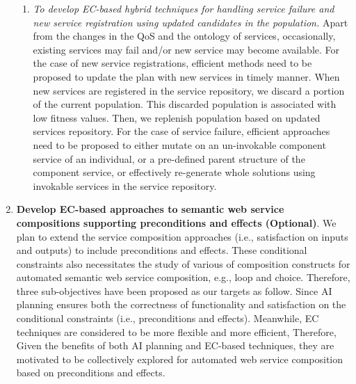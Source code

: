 \begin{enumerate}
\begin{enumerate}
 
 \item \emph{To develop EC-based hybrid techniques for handling service failure and new service registration using updated candidates in the population.} Apart from the changes in the QoS and the ontology of services, occasionally, existing services may fail and/or new service may become available. For the case of new service registrations, efficient methods need to be proposed to update the plan with new services in timely manner. When new services are registered in the service repository, we discard a portion of the current population. This discarded population is associated with low fitness values. Then, we replenish population based on updated services repository. For the case of service failure, efficient approaches need to be proposed to either mutate on an un-invokable component service of an individual, or a pre-defined parent structure of the component service, or effectively re-generate whole solutions using invokable services in the service repository. 
 \end{enumerate}
   
 \item \textbf{Develop EC-based approaches to semantic web service compositions supporting preconditions and effects (Optional)}. We plan to extend the service composition approaches (i.e., satisfaction on inputs and outputs) to include preconditions and effects. These conditional constraints also necessitates the study of various of composition constructs for automated semantic web service composition, e.g., loop and choice. Therefore, three sub-objectives have been proposed as our targets as follow. Since AI planning ensures both the correctness of functionality and satisfaction on the conditional constraints (i.e., preconditions and effects). Meanwhile, EC techniques are considered to be more flexible and more efficient, Therefore, Given the benefits of both AI planning and EC-based techniques, they are motivated to be collectively explored for automated web service composition based on preconditions and effects.
 
 \begin{enumerate}
 

\end{enumerate}
\end{enumerate}
